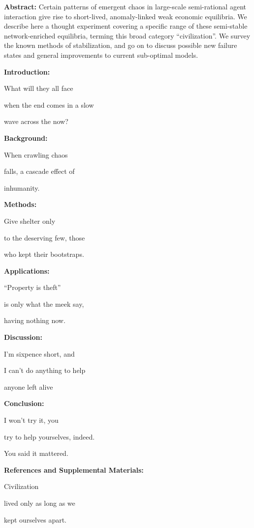
\textbf{Abstract:} Certain patterns of emergent chaos in large-scale
semi-rational agent interaction give rise to short-lived, anomaly-linked
weak economic equilibria. We describe here a thought experiment covering
a specific range of these semi-stable network-enriched equilibria,
terming this broad category ``civilization''. We survey the known
methods of stabilization, and go on to discuss possible new failure
states and general improvements to current sub-optimal models.

\textbf{Introduction:}

What will they all face

when the end comes in a slow

wave across the now?

\textbf{Background:}

When crawling chaos

falls, a cascade effect of

inhumanity.

\textbf{Methods:}

Give shelter only

to the deserving few, those

who kept their bootstraps.

\textbf{Applications:}

``Property is theft''

is only what the meek say,

having nothing now.

\textbf{Discussion:}

I'm sixpence short, and

I can't do anything to help

anyone left alive

\textbf{Conclusion:}

I won't try it, you

try to help yourselves, indeed.

You said it mattered.

\textbf{References and Supplemental Materials:}

Civilization

lived only as long as we

kept ourselves apart.
